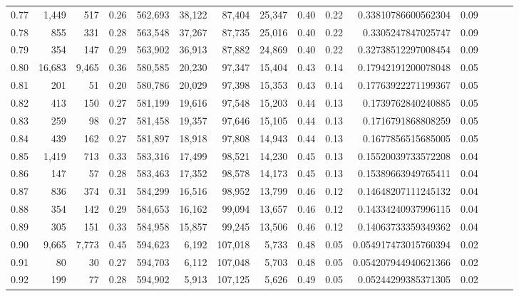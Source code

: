 \begin{tabular}{rrrrrrrrrrrrrrr}
0.77 &   1,449 &     517 &  0.26 &  562,693 &   38,122 &   87,404 &   25,347 &  0.40 &  0.22 &   0.33810786600562304 &      0.09 \\
0.78 &     855 &     331 &  0.28 &  563,548 &   37,267 &   87,735 &   25,016 &  0.40 &  0.22 &    0.3305247847025747 &      0.09 \\
0.79 &     354 &     147 &  0.29 &  563,902 &   36,913 &   87,882 &   24,869 &  0.40 &  0.22 &   0.32738512297008454 &      0.09 \\
0.80 &  16,683 &   9,465 &  0.36 &  580,585 &   20,230 &   97,347 &   15,404 &  0.43 &  0.14 &   0.17942191200078048 &      0.05 \\
0.81 &     201 &      51 &  0.20 &  580,786 &   20,029 &   97,398 &   15,353 &  0.43 &  0.14 &   0.17763922271199367 &      0.05 \\
0.82 &     413 &     150 &  0.27 &  581,199 &   19,616 &   97,548 &   15,203 &  0.44 &  0.13 &    0.1739762840240885 &      0.05 \\
0.83 &     259 &      98 &  0.27 &  581,458 &   19,357 &   97,646 &   15,105 &  0.44 &  0.13 &    0.1716791868808259 &      0.05 \\
0.84 &     439 &     162 &  0.27 &  581,897 &   18,918 &   97,808 &   14,943 &  0.44 &  0.13 &    0.1677856515685005 &      0.05 \\
0.85 &   1,419 &     713 &  0.33 &  583,316 &   17,499 &   98,521 &   14,230 &  0.45 &  0.13 &   0.15520039733572208 &      0.04 \\
0.86 &     147 &      57 &  0.28 &  583,463 &   17,352 &   98,578 &   14,173 &  0.45 &  0.13 &   0.15389663949765411 &      0.04 \\
0.87 &     836 &     374 &  0.31 &  584,299 &   16,516 &   98,952 &   13,799 &  0.46 &  0.12 &   0.14648207111245132 &      0.04 \\
0.88 &     354 &     142 &  0.29 &  584,653 &   16,162 &   99,094 &   13,657 &  0.46 &  0.12 &   0.14334240937996115 &      0.04 \\
0.89 &     305 &     151 &  0.33 &  584,958 &   15,857 &   99,245 &   13,506 &  0.46 &  0.12 &   0.14063733359349362 &      0.04 \\
0.90 &   9,665 &   7,773 &  0.45 &  594,623 &    6,192 &  107,018 &    5,733 &  0.48 &  0.05 &  0.054917473015760394 &      0.02 \\
0.91 &      80 &      30 &  0.27 &  594,703 &    6,112 &  107,048 &    5,703 &  0.48 &  0.05 &  0.054207944940621366 &      0.02 \\
0.92 &     199 &      77 &  0.28 &  594,902 &    5,913 &  107,125 &    5,626 &  0.49 &  0.05 &   0.05244299385371305 &      0.02 \\

\end{tabular}
